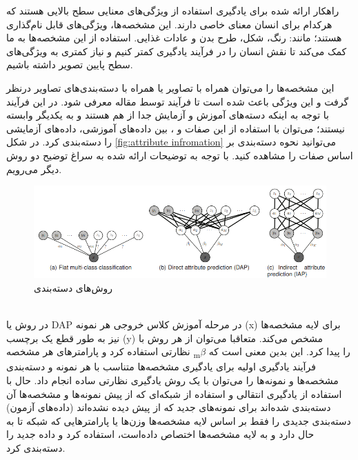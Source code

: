 راهکار ارائه شده برای یادگیری استفاده از ویژگی‌های معنایی سطح بالایی هستند که هرکدام برای انسان معنای خاصی دارند. این مشخصه‌ها، ویژگی‌های قابل نام‌گذاری هستند؛ مانند: رنگ، شکل، طرح بدن و عادات غذایی. استفاده از این مشخصه‌‌ها به ما کمک می‌کند تا نقش انسان را در فرآیند یادگیری کمتر کنیم و نیاز کمتری به ویژگی‌های سطح پایین تصویر داشته باشیم.

این مشخصه‌ها را می‌توان همراه با تصاویر یا همراه با دسته‌بندی‌های تصاویر درنظر گرفت و این ویژگی باعث شده است تا فرآیند
توسط مقاله معرفی شود. در این فرآیند با توجه به اینکه دسته‌های آموزش و آزمایش جدا از هم هستند و به یکدیگر وابسته نیستند؛ می‌توان با استفاده از این صفات و
،
بین داده‌های آموزشی، داده‌های آزمایشی را دسته‌بندی کرد. در شکل
\ref{fig:attribute infromation}
می‌توانید نحوه دسته‌بندی بر اساس صفات را مشاهده کنید.
با توجه به توضیحات ارائه شده به سراغ توضیح دو روش دیگر می‌رویم.
\begin{figure}[h]

    \centering
    \includegraphics[width=\textwidth]{img/report/learning-methods}
    \caption{روش‌های دسته‌بندی \cite{Lampert2014}}
    \label{fig:learning-methods}
    \centering
\end{figure}
\\
در روش
یا DAP در مرحله آموزش کلاس خروجی هر نمونه (x) برای لایه مشخصه‌ها نیز به طور قطع یک برچسب (y) مشخص می‌کند. متعاقبا می‌توان از هر روش با نظارتی استفاده کرد و پارامتر‌های هر مشخصه‌
\textsubscript{m}$\beta$
را پیدا کرد. این بدین معنی است که فرآیند یادگیری اولیه برای یادگیری مشخصه‌ها متناسب با هر نمونه و دسته‌بندی مشخصه‌ها و نمونه‌ها را می‌توان با یک روش یادگیری نظارتی ساده انجام داد. حال با استفاده از یادگیری انتقالی و استفاده از شبکه‌ای که از پیش نمونه‌ها و مشخصه‌ها آن دسته‌بندی شده‌اند برای نمونه‌های جدید که از پیش دیده نشده‌اند (داده‌های آزمون) دسته‌بندی جدیدی را فقط بر اساس لایه مشخصه‌ها وزن‌ها یا پارامتر‌هایی که شبکه تا به حال دارد و به لایه مشخصه‌ها اختصاص داده‌است، استفاده کرد و داده جدید را دسته‌بندی کرد.
\\
